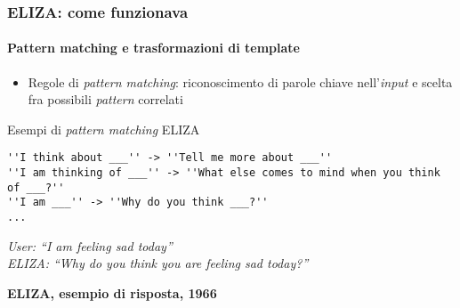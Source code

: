 %
\begin{frame}[t,fragile] \frametitle{ELIZA: come funzionava}
	{\small
		\onslide<1->
		\framesubtitle{Pattern matching e trasformazioni di template}
		\begin{itemize}[leftmargin=10pt,align=right]
			\item[\alert{\faHandORight}] \alert{Regole di \textit{pattern matching}:} riconoscimento di parole chiave nell'\textit{input} e scelta fra possibili \textit{pattern} correlati
		\end{itemize}
		\vspace*{.3cm}
		\begin{shellcodeblock}{Esempi di \textit{pattern matching} ELIZA}
        	\begin{verbatim}
''I think about ___'' -> ''Tell me more about ___''
''I am thinking of ___'' -> ''What else comes to mind when you think of ___?''
''I am ___'' -> ''Why do you think ___?''
...
        	\end{verbatim}
    	\end{shellcodeblock}
		\hspace*{4cm}
		\begin{minipage}[t]{.6\textwidth}
			\renewcommand{\epigraphsize}{\scriptsize}
			\setlength{\afterepigraphskip}{0pt}
			\setlength{\beforeepigraphskip}{5pt}
			\setlength{\epigraphwidth}{0.9\textwidth}
			\epigraph{\textit{\alert{User:} ``\alert{I am} feeling sad today''\\
			\alert{ELIZA:} ``Why do you think you are feeling sad today?''}}{\textbf{ELIZA, esempio di risposta, 1966}}
		\end{minipage}
	}
\end{frame}
%
